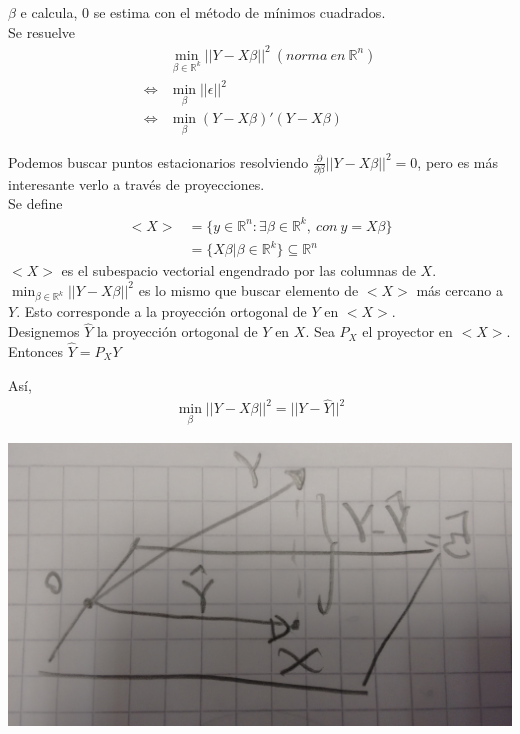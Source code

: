 \documentclass[10pt]{article}
\theoremstyle{plain}
\theoremstyle{definition}
\begin{document}
$\beta$ e calcula, $0$ se estima con el método de mínimos cuadrados.\\

Se resuelve
\begin{align*}
& \min_{\beta \in \mathbb{R}^k} ||Y-X\beta||^2\ (norma\ en\ \mathbb{R}^n)\\
\Leftrightarrow & \min_{\beta} ||\epsilon||^2\\
\Leftrightarrow & \min_{\beta} (Y-X\beta)'(Y-X\beta)
\end{align*}

Podemos buscar puntos estacionarios resolviendo $\frac{\partial}{\partial \beta} ||Y-X\beta||^2 = 0$, pero es más interesante verlo a través de proyecciones.\\

Se define
\begin{align*}
<X> &= \{y \in \mathbb{R}^n\colon \exists \beta \in \mathbb{R}^k,\ con\ y=X\beta\}\\
&= \{X\beta | \beta \in \mathbb{R}^k\} \subseteq \mathbb{R}^n
\end{align*}
$<X>$ es el subespacio vectorial engendrado por las columnas de $X$.\\

$\min_{\beta \in \mathbb{R}^k} ||Y-X\beta||^2$ es lo mismo que buscar elemento de $<X>$ más cercano a $Y$. Esto corresponde a la proyección ortogonal de $Y$ en $<X>$.\\

Designemos $\hat{Y}$ la proyección ortogonal de $Y$ en $X$. Sea $P_{X}$ el proyector en $<X>$. Entonces $\hat{Y} = P_{X}Y$

Así,
\begin{align*}
\min_{\beta} ||Y-X\beta||^2 = ||Y-\hat{Y}||^2
\end{align*}

\begin{center}
\includegraphics[scale=0.1]{imagenes/proyeccion.jpg}
\end{center}
\end{document}
